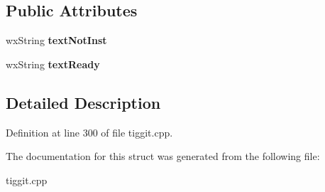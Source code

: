 \subsection*{Public Attributes}
\begin{DoxyCompactItemize}
\item 
\hypertarget{struct_status_col_acc73c933bc916d9868fdef1bad316471}{wx\-String {\bfseries text\-Not\-Inst}}\label{struct_status_col_acc73c933bc916d9868fdef1bad316471}

\item 
\hypertarget{struct_status_col_a4d9fb49d4419e9be1b1b54bdce15cf11}{wx\-String {\bfseries text\-Ready}}\label{struct_status_col_a4d9fb49d4419e9be1b1b54bdce15cf11}

\end{DoxyCompactItemize}


\subsection{Detailed Description}


Definition at line 300 of file tiggit.\-cpp.



The documentation for this struct was generated from the following file\-:\begin{DoxyCompactItemize}
\item 
tiggit.\-cpp\end{DoxyCompactItemize}
